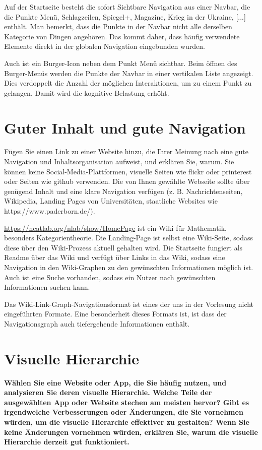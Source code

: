 \documentclass[a4paper,12pt]{article}
\begin{document}
Auf der Startseite besteht die sofort Sichtbare Navigation aus einer
Navbar, die die Punkte Menü, Schlagzeilen, Spiegel+, Magazine, Krieg in der Ukraine, [...] enthält.
Man bemerkt, dass die Punkte in der Navbar nicht alle derselben Kategorie von
Dingen angehören. Das kommt daher, dass häufig verwendete Elemente direkt
in der globalen Navigation eingebunden wurden.

Auch ist ein Burger-Icon neben dem Punkt Menü sichtbar. Beim öffnen des
Burger-Menüs werden die Punkte der Navbar in einer vertikalen Liste angezeigt.
Dies verdoppelt die Anzahl der möglichen Interaktionen, um zu einem Punkt
zu gelangen. Damit wird die kognitive Belastung erhöht.

\section{Guter Inhalt und gute Navigation}
Fügen Sie einen Link zu einer Website hinzu, die
Ihrer Meinung nach eine gute Navigation und Inhaltsorganisation aufweist, und
erklären Sie, warum. Sie können keine Social-Media-Plattformen, visuelle Seiten wie
flickr oder printerest oder Seiten wie github verwenden. Die von Ihnen gewählte
Webseite sollte über genügend Inhalt und eine klare Navigation verfügen (z. B.
Nachrichtenseiten, Wikipedia, Landing Pages von Universitäten, staatliche Websites
wie https://www.paderborn.de/).

\url{https://ncatlab.org/nlab/show/HomePage} ist ein Wiki für Mathematik, besonders
Kategorientheorie. Die Landing-Page ist selbst eine Wiki-Seite, sodass diese
über den Wiki-Prozess aktuell gehalten wird. Die Startseite fungiert als Readme über
das Wiki und verfügt über Links in das Wiki, sodass eine Navigation in den Wiki-Graphen
zu den gewünschten Informationen möglich ist. Auch ist eine Suche vorhanden, sodass
ein Nutzer nach gewünschten Informationen suchen kann.

Das Wiki-Link-Graph-Navigationsformat ist eines der uns in der Vorlesung nicht
eingeführten Formate. Eine besonderheit dieses Formats ist, ist dass der Navigationsgraph
auch tiefergehende Informationen enthält.

\section{Visuelle Hierarchie}
\textbf{Wählen Sie eine Website oder App, die Sie häufig nutzen, und
  analysieren Sie deren visuelle Hierarchie. Welche Teile der ausgewählten App oder
  Website stechen am meisten hervor? Gibt es irgendwelche Verbesserungen oder
  Änderungen, die Sie vornehmen würden, um die visuelle Hierarchie effektiver zu
  gestalten? Wenn Sie keine Änderungen vornehmen würden, erklären Sie, warum die
  visuelle Hierarchie derzeit gut funktioniert.}
\end{document}
